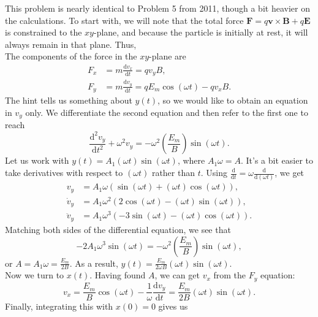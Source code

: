 \documentclass[../TST.tex]{subfiles}
\begin{document}
\ifprob \else
	\begin{solution} This problem is nearly identical to Problem 5 from 2011, though a bit heavier on the calculations. To start with, we will note that the total force $\mathbf{F}=q\mathbf{v}\times \mathbf{B}+q\mathbf{E}$ is constrained to the $xy$-plane, and because the particle is initially at rest, it will always remain in that plane. Thus, \\[5pt]
The components of the force in the $xy$-plane are
	\begin{align*}
		F_x &= m \frac{\mathrm{d}v_x}{\mathrm{d}t}=qv_yB,\\
		F_y &= m \frac{\mathrm{d}v_y}{\mathrm{d}t}=qE_m\cos{(\omega t)}-qv_xB.
	\end{align*}
The hint tells us something about $y(t)$, so we would like to obtain an equation in $v_y$ only. We differentiate the second equation and then refer to the first one to reach
\begin{equation*}
	\frac{\mathrm{d}^2v_y}{\mathrm{d}{t}^2}+\omega^2v_y=-\omega^2 \left(\frac{E_m}{B}\right)\sin{(\omega t)}
.
\end{equation*}
Let us work with $y(t)=A_1(\omega t)\sin{(\omega t)}$, where $A_1\omega=A$. It's a bit easier to take derivatives with respect to $(\omega t)$ rather than $t$. Using $\frac{\mathrm{d}}{\mathrm{d}t}=\omega \frac{\mathrm{d}}{\mathrm{d}(\omega t)}$, we get
\begin{align*}
	v_y&=A_1\omega (\sin{(\omega t)}+(\omega t)\cos{(\omega t)})
,\\
	\dot{v}_y&=A_1\omega^2 (2\cos{(\omega t)}-(\omega t)\sin{(\omega t)})
,\\
	\ddot{v}_y&=A_1\omega^3 (-3\sin{(\omega t)}-(\omega t)\cos{(\omega t)})
.
\end{align*}
Matching both sides of the differential equation, we see that
\begin{equation*}
	-2A_1\omega^3\sin{(\omega t)}=-\omega^2 \left(\frac{E_m}{B}\right) \sin{(\omega t)},
\end{equation*}
or $A=A_1\omega = \frac{E_m}{2B}$. As a result, $\boxed{y(t)=\frac{E_m}{2\omega B}(\omega t)\sin{(\omega t)}.}$\\[5pt]
Now we turn to $x(t)$. Having found $A$, we can get $v_x$ from the $F_y$ equation:
\begin{equation*}
	v_x=\frac{E_m}{B}\cos{(\omega t)}- \frac{1}{\omega}\frac{\mathrm{d}v_y}{\mathrm{d}t}=\frac{E_m}{2B}(\omega t)\sin{(\omega t)}
.
\end{equation*}
Finally, integrating this with $x(0)=0$ gives us

\end{solution}
\end{document}
